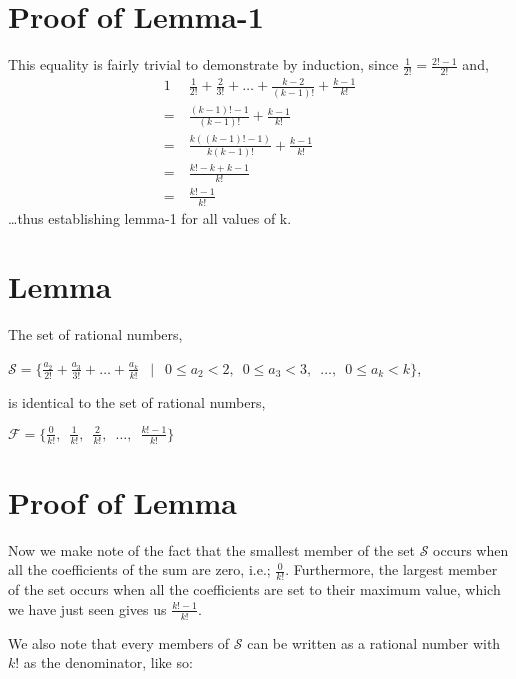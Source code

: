 \documentclass{article}
\begin{document}
\section*{Proof of Lemma-1}

This equality is fairly trivial to demonstrate by induction, since $\frac{1}{2!} = \frac{2!-1}{2!}$ and, 
{\footnotesize
\begin{alignat*}{1}
  &\frac{1}{2!} + \frac{2}{3!} + \dots{} + \frac{k-2}{(k-1)!} + \frac{k-1}{k!}\\
  =\  &\frac{(k-1)!-1}{(k-1)!} + \frac{k-1}{k!}\\
  =\  &\frac{k((k-1)!-1)}{k(k-1)!} + \frac{k-1}{k!}\\
  =\  &\frac{k!-k+k-1}{k!}\\
  =\  &\frac{k!-1}{k!}
\end{alignat*}
}
\dots{}thus establishing lemma-1 for all values of k.

\section*{Lemma}

The set of rational numbers,\newline

\centerline{$\mathcal{S} = \{\frac{a_2}{2!} + \frac{a_3}{3!} + \dots{} + \frac{a_k}{k!}\enspace\mid\enspace 
0\! \le{}\! a_2\! <\! 2,\enspace 
0\! \le{}\! a_3\! <\! 3,\enspace 
\dots{},\enspace 0\! \le{}\! a_k\! <\! k\}$,}
\bigskip
is identical to the set of rational numbers,\newline

\centerline{$\mathcal{F} = \{\frac{0}{k!},\enspace \frac{1}{k!},\enspace \frac{2}{k!},\enspace \dots{},\enspace \frac{k!-1}{k!}\}$}

\break
\section*{Proof of Lemma}


Now we make note of the fact that the smallest member of the set $\mathcal{S}$ 
occurs when all the coefficients of the sum are zero, i.e.; $\frac{0}{k!}$.
Furthermore, the largest member of the set occurs when all the coefficients are set to
their maximum value, which we have just seen gives us $\frac{k!-1}{k!}$.

We also note that every members of $\mathcal{S}$ can be written as a rational number
with $k!$ as the denominator, like so:\newline
\end{document}
